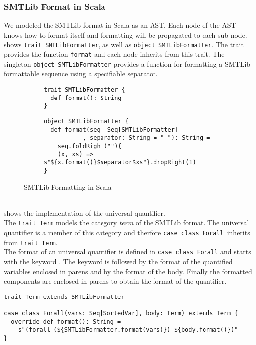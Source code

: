 \subsubsection{SMTLib Format in Scala}
%
\lstset{ language=scala,basicstyle=\small }
%
We modeled the SMTLib format in Scala as an AST.
Each node of the AST knows how to format itself
and formatting will be propagated to each sub-node.\\
 shows 
\lstinline{trait SMTLibFormatter}, as well as
\lstinline{object SMTLibFormatter}.
The trait provides the function \lstinline{format}
and each node inherits from this trait.
The singleton \lstinline{object SMTLibFormatter}
provides a function for formatting a SMTLib formattable
sequence using a specifiable separator.
%
\begin{figure}[h]
\begin{subfigure}[c]{1\textwidth}
\begin{lstlisting}
trait SMTLibFormatter {
  def format(): String
}
\end{lstlisting}
\end{subfigure}
\begin{subfigure}[c]{1\textwidth}
\begin{lstlisting}
object SMTLibFormatter {
  def format(seq: Seq[SMTLibFormatter]
           , separator: String = " "): String =
    seq.foldRight(""){
    (x, xs) => s"${x.format()}$separator$xs"}.dropRight(1)
}
\end{lstlisting}
\end{subfigure}
\caption{SMTLib Formatting in Scala}
\label{fig:scala-format}
\end{figure}\\
%
 shows the implementation
of the universal quantifier.\\
The \lstinline{trait Term} models the category \textit{term}
of the SMTLib format.
The universal quantifier is a member of this category
and therfore \lstinline{case class Forall}\ inherits from \lstinline{trait Term}.\\
The format of an universal quantifier is defined
in \lstinline{case class Forall} and starts
with the keyword .
The keyword is followed by the format of the quantified variables
enclosed in parens and by the format of the body.
Finally the formatted components are enclosed in parens
to obtain the format of the quantifier.
%
\begin{example}
\label{ex:scala-format}
\begin{lstlisting}
trait Term extends SMTLibFormatter

case class Forall(vars: Seq[SortedVar], body: Term) extends Term {
  override def format(): String =
    s"(forall (${SMTLibFormatter.format(vars)}) ${body.format()})"
}
\end{lstlisting}
\end{example}

